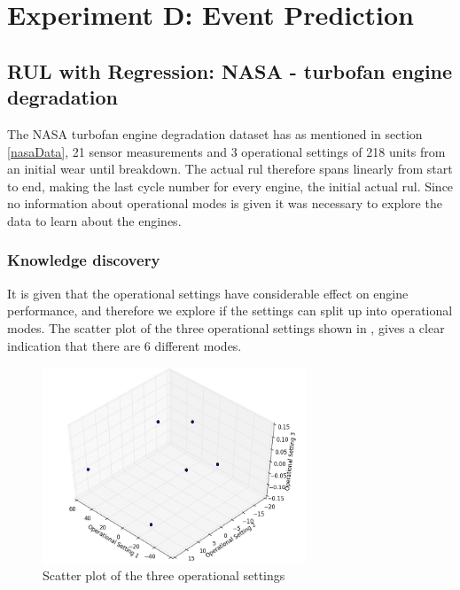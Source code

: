 \documentclass[english, a4paper]{report}
\begin{document}
{    \section{Experiment D: Event Prediction}\label{EventPredictionResult}
    {
        \subsection{RUL with Regression: NASA - turbofan engine degradation} \label{NASATurbofanRegr}
        {
            The NASA turbofan engine degradation dataset has as mentioned in section \ref{nasaData}, 21 sensor measurements and 3 operational settings of 218 units from an initial wear until breakdown. The actual \acrfull{rul} therefore spans linearly from start to end, making the last cycle number for every engine, the initial actual \gls{rul}. Since no information about operational modes is given it was necessary to explore the data to learn about the engines. 
            
            \subsubsection{Knowledge discovery}
            {
                It is given that the operational settings have considerable effect on engine performance, and therefore we explore if the settings can split up into operational modes. The scatter plot of the three operational settings shown in , gives a clear indication that there are 6 different modes. 
                
                \begin{figure}[H]
                    \centering \includegraphics[width=0.7\textwidth]{OP_Settings_PCA3D}
                    \caption{Scatter plot of the three operational settings}
                    \label{fig:OP_Settings_PCA3D}
                \end{figure}
                
}}}}
\end{document}
